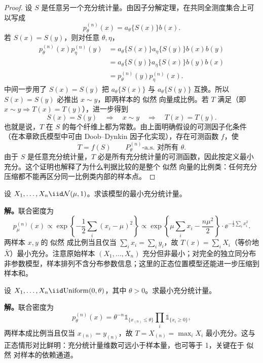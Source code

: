 \begin{proof}
设 $S$ 是任意另一个充分统计量。由因子分解定理，在共同全测度集合上可以写成
\[
 p_\theta^{(n)}(x)
 =a_\theta\{S(x)\}b(x).
\]
若 $S(x)=S(y)$，则对任意 $\theta,\eta$，
\begin{align*}
 p_\theta^{(n)}(x)p_\eta^{(n)}(y)
 &=a_\theta\{S(x)\}a_\eta\{S(y)\}b(x)b(y)\\
 &=a_\theta\{S(y)\}a_\eta\{S(x)\}b(y)b(x)\\
 &=p_\theta^{(n)}(y)p_\eta^{(n)}(x).
\end{align*}
中间一步用了 $S(x)=S(y)$ 把 $a_\theta\{S(x)\}$ 与 $a_\theta\{S(y)\}$ 互换。所以 $S(x)=S(y)$ 必推出 $x\sim y$，即两样本的 似然 向量成比例。若 $T$ 满足（即 $x\sim y\Rightarrow T(x)=T(y)$），进一步得到
\[
 S(x)=S(y)
 \quad\Longrightarrow\quad
 x\sim y
 \quad\Longrightarrow\quad
 T(x)=T(y).
\]
也就是说，$T$ 在 $S$ 的每个纤维上都为常数。由上面明确假设的可测因子化条件（在本章欧氏模型中可由 Doob--Dynkin 因子化实现），存在可测函数 $f$，使
\[
 T=f(S)
 \qquad P_\theta^{(n)}\text{-a.s. 对所有 }\theta.
\]
由于 $S$ 是任意充分统计量，$T$ 必是所有充分统计量的可测函数，因此按定义最小充分。这个证明也解释了为什么判据比较的是整个 似然 向量的比例类：任何充分压缩都不能再区分同一比例类内部的样本点。
\end{proof}

\begin{workedexample}[正态位置的最小充分统计量]
设 $X_1,\ldots,X_n\iid\mathcal N(\mu,1)$。求该模型的最小充分统计量。

\textbf{解。}联合密度为
\[
p_\mu^{(n)}(x)\propto\exp\!\left\{-\frac12\sum_i(x_i-\mu)^2\right\}
\propto\exp\!\left\{\mu\sum_i x_i-\frac{n\mu^2}{2}\right\}\cdot\ee^{-\frac12\sum_i x_i^2}.
\]
两样本 $x,y$ 的 似然 成比例当且仅当 $\sum_i x_i=\sum_i y_i$，故 $T(x)=\sum_i X_i$（等价地 $\bar X$）最小充分。注意原始样本 $(X_1,\ldots,X_n)$ 充分但非最小；对完全的独立同分布非参数模型，样本排列不含分布参数信息；这里的正态位置模型还能进一步压缩到样本和。
\end{workedexample}

\begin{workedexample}[均匀端点的最小充分统计量]
设 $X_1,\ldots,X_n\iid\mathrm{Uniform}(0,\theta)$，其中 $\theta>0$。求最小充分统计量。

\textbf{解。}联合密度为
\[
p_\theta^{(n)}(x)=\theta^{-n}\mathds{1}_{\{x_{(n)}\le\theta\}}\prod_i\mathds{1}_{\{x_i\ge0\}},
\]
两样本成比例当且仅当 $x_{(n)}=y_{(n)}$，故 $T=X_{(n)}=\max_i X_i$ 最小充分。这与正态情形对比鲜明：充分统计量维数可远小于样本量，也可等于 1，关键在于 似然 对样本的依赖通道。
\end{workedexample}

